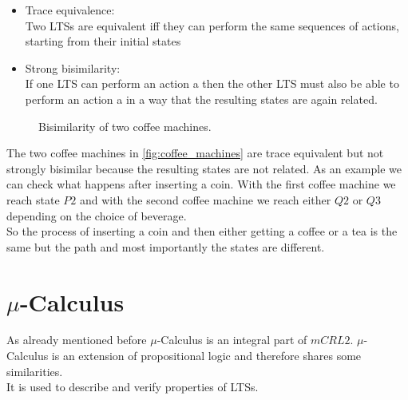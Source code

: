 \documentclass{clseminar}
\begin{document}
  \begin{itemize}[noitemsep]
    \item Trace equivalence: \\
    Two LTSs are equivalent iff they can perform the same sequences of actions, starting from their initial states \\
    \item Strong bisimilarity: \\
    If one LTS can perform an action a then the other LTS must also be able to perform an action a in a way that the resulting states are again related. \\
  \end{itemize}

  \begin{figure}[!ht]
    \resizebox{\textwidth}{!}{}
    \caption{Bisimilarity of two coffee machines.}
    \label{fig:coffee_machines}
  \end{figure}

  The two coffee machines in \autoref{fig:coffee_machines} are trace equivalent but not strongly bisimilar because the resulting states are not related. As an example we can check what happens after inserting a coin. With the first coffee machine we reach state $P2$ and with the second coffee machine we reach either $Q2$ or $Q3$ depending on the choice of beverage.\\
  So the process of inserting a coin and then either getting a coffee or a tea is the same but the path and most importantly the states are different.

  \section{$\mu$-Calculus}
  As already mentioned before $\mu$-Calculus is an integral part of $mCRL2$. $\mu$-Calculus is an extension of propositional logic and therefore shares some similarities. \\
  It is used to describe and verify properties of LTSs.
\end{document}
